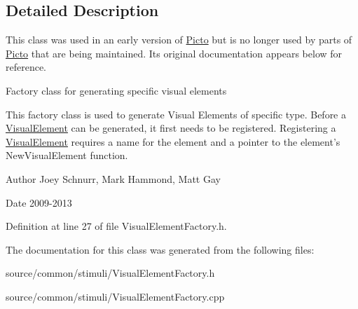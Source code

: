 \subsection{Detailed Description}
This class was used in an early version of \hyperlink{namespace_picto}{Picto} but is no longer used by parts of \hyperlink{namespace_picto}{Picto} that are being maintained. Its original documentation appears below for reference. 

Factory class for generating specific visual elements

This factory class is used to generate Visual Elements of specific type. Before a \hyperlink{struct_picto_1_1_visual_element}{Visual\-Element} can be generated, it first needs to be registered. Registering a \hyperlink{struct_picto_1_1_visual_element}{Visual\-Element} requires a name for the element and a pointer to the element's New\-Visual\-Element function. \begin{DoxyAuthor}{Author}
Joey Schnurr, Mark Hammond, Matt Gay 
\end{DoxyAuthor}
\begin{DoxyDate}{Date}
2009-\/2013 
\end{DoxyDate}


Definition at line 27 of file Visual\-Element\-Factory.\-h.



The documentation for this class was generated from the following files\-:\begin{DoxyCompactItemize}
\item 
source/common/stimuli/Visual\-Element\-Factory.\-h\item 
source/common/stimuli/Visual\-Element\-Factory.\-cpp\end{DoxyCompactItemize}
